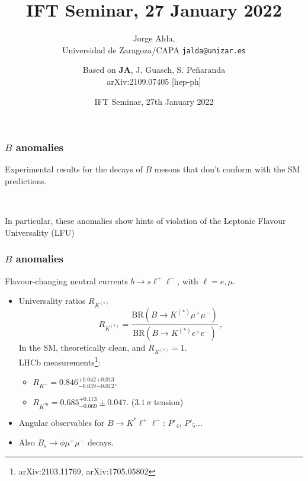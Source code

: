 \documentclass[mathserif, 10pt]{beamer}
\title{IFT Seminar, 27 January 2022}
\subtitle{Jorge Alda,\\ Universidad de Zaragoza/CAPA \hspace{4em} \texttt{jalda@unizar.es} }
\author[Jorge Alda]{Based on \textbf{JA}, J. Guasch, S. Peñaranda \\
arXiv:2109.07405 [hep-ph]}
\date[IFT Seminar]{IFT Seminar, 27th January 2022}
\begin{document}
\begin{frame}
\titlepage
\end{frame}

\begin{frame}
    \frametitle{$B$ anomalies}

    Experimental results for the decays of $B$ mesons that don't conform with the SM predictions.

    ~

    In particular, these anomalies show hints of violation of the Leptonic Flavour Universality (LFU)

\end{frame}

\begin{frame}
    \frametitle{$B$ anomalies}

    Flavour-changing neutral currents $b \to s \ell^+ \ell^-$, with $\ell = e, \mu$.
    \begin{itemize}
        \item Universality ratios $R_{K^{(*)}}$
              $$R_{K^{(*)}} = \frac{\mathrm{BR}(B\to K^{(*)}\mu^+ \mu^-)}{\mathrm{BR}(B\to K^{(*)}e^+ e^-)}\,, $$
              In the SM, theoretically clean, and $R_{K^{(*)}}=1$.\\
              LHCb measurements\footnote{arXiv:2103.11769, arXiv:1705.05802}:
              \begin{itemize}
                  \item $R_{K^+} = 0.846^{+0.042}_{-0.039}{}^{+0.013}_{-0.012}$,
                  \item $R_{K^{*0}} = 0.685^{+0.113}_{-0.069}\pm0.047$. ($3.1\,\sigma$ tension)
              \end{itemize}
        \item Angular observables for $B\to K^* \ell^+\ell^-$: $P'_4$, $P'_5$...
        \item Also $B_s \to \phi \mu^+ \mu^-$ decays.
    \end{itemize}

\end{frame}
\end{document}
